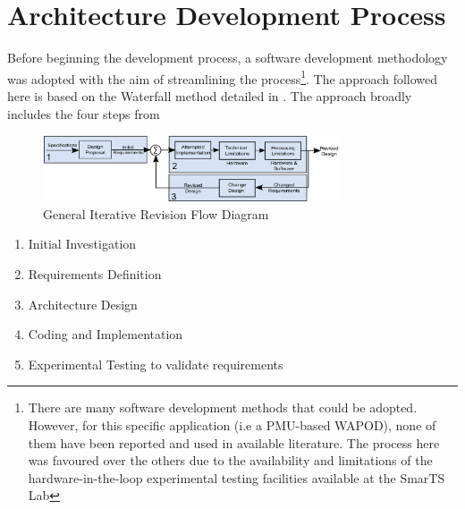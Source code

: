 \documentclass[conference]{IEEEtran}
\begin{document}
\section{Architecture Development Process}\label{arch}

Before beginning the development process, a software development methodology was adopted with the aim of streamlining the process\footnote{There are many software development methods that could be adopted. However, for this specific application (i.e a PMU-based WAPOD), none of them have been reported and used in available literature. The process here was favoured over the others due to the availability and limitations of the hardware-in-the-loop experimental testing facilities available at the SmarTS Lab\cite{SmarTSLab}}. The approach followed here is based on the Waterfall method detailed in \cite{WaterfallCoding}. The approach broadly includes the four steps from \cite{WaterfallCoding} 

\begin{figure}[htb]
\centering
\includegraphics[width=3.45in]{RevisionFlow.png} 
\vspace{-0.5em}
\caption{General Iterative Revision Flow Diagram}
\label{fig:RevisionFlow}
\end{figure}

\begin{enumerate}
\item Initial Investigation
\item Requirements Definition
\item Architecture Design
\item Coding and Implementation
\item Experimental Testing to validate requirements
\end{enumerate}
\end{document}
